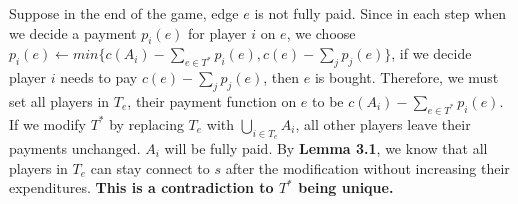 \documentclass[11pt,psfig,times]{article}
\begin{document}
	
	
	
	
 Suppose in the end of the game, edge $e$ is not fully paid. Since in each step when we decide a payment $p_i(e)$ for player $i$ on $e$, we choose \(p_i(e) \gets min\{c(A_i) - \sum_{e\in T^*}p_i(e), c(e)-\sum_{j}p_j(e) \}\), if we decide player $i$ needs to pay $c(e)-\sum_{j}p_j(e) $, then $e$ is bought. Therefore, we must set all players in $T_e$, their payment function on $e$ to be $c(A_i) - \sum_{e\in T^*}p_i(e)$. If we modify $T^*$ by replacing $T_e$ with \(\bigcup_{i\in T_e} A_i\), all other players leave their payments unchanged. $A_i$ will be fully paid. By \textbf{Lemma 3.1}, we know that all players in $T_e$ can stay connect to $s$ after the modification without increasing their expenditures. \textbf{This is a contradiction to $T^*$ being unique.}
\end{document}
